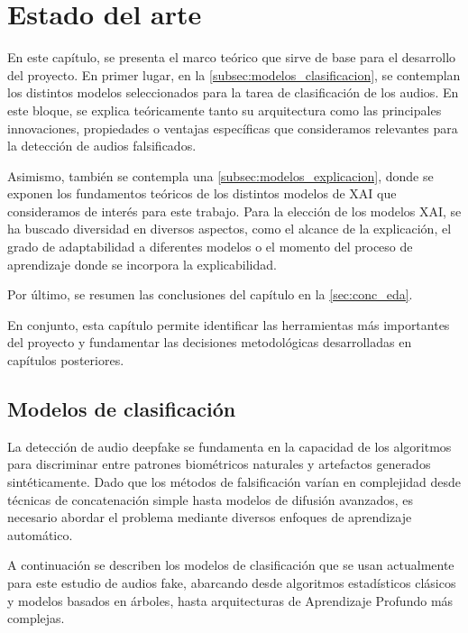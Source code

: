 \chapter{Estado del arte}
\label{sec:estado_del_arte}

En este capítulo, se presenta el marco teórico que sirve de base para el desarrollo del proyecto. En primer lugar, en la \autoref{subsec:modelos_clasificacion}, se contemplan los distintos modelos seleccionados para la tarea de clasificación de los audios. En este bloque, se explica teóricamente tanto su arquitectura como las principales innovaciones, propiedades o ventajas específicas que consideramos relevantes para la detección de audios falsificados.

Asimismo, también se contempla una \autoref{subsec:modelos_explicacion}, donde se exponen los fundamentos teóricos de los distintos modelos de XAI que consideramos de interés para este trabajo. Para la elección de los modelos XAI, se ha buscado diversidad en diversos aspectos, como el alcance de la explicación, el grado de adaptabilidad a diferentes modelos o el momento del proceso de aprendizaje donde se incorpora la explicabilidad.

Por último, se resumen las conclusiones del capítulo en la \autoref{sec:conc_eda}.

En conjunto, esta capítulo permite identificar las herramientas más importantes del proyecto y fundamentar las decisiones metodológicas desarrolladas en capítulos posteriores.

\section{Modelos de clasificación}
\label{subsec:modelos_clasificacion}

La detección de audio deepfake se fundamenta en la capacidad de los algoritmos para discriminar entre patrones biométricos naturales y artefactos generados sintéticamente. Dado que los métodos de falsificación varían en complejidad desde técnicas de concatenación simple hasta modelos de difusión avanzados, es necesario abordar el problema mediante diversos enfoques de aprendizaje automático.

A continuación se describen los modelos de clasificación que se usan actualmente para este estudio de audios fake, abarcando desde algoritmos estadísticos clásicos y modelos basados en árboles, hasta arquitecturas de Aprendizaje Profundo más complejas.



